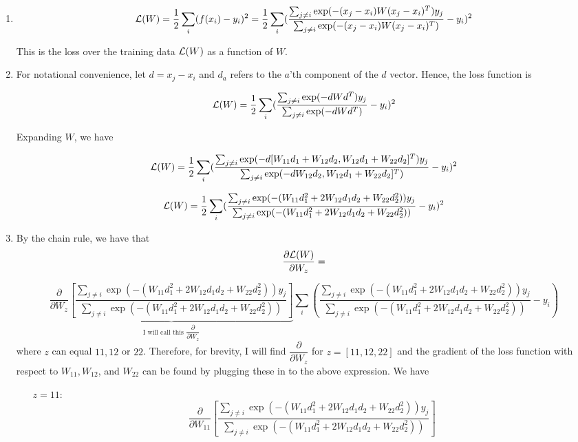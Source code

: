 \documentclass[submit]{harvardml}
\begin{document}
\begin{enumerate}
    \item $$\mathcal{L}(W) = \frac{1}{2}\sum_{i}(f(x_i)-y_i)^2 = \frac{1}{2}\sum_{i}(\frac{\sum_{j\neq i} \exp(-(x_j-x_i) W (x_j-x_i)^T )y_j}{\sum_{j\neq i} \exp(-(x_j-x_i) W (x_j-x_i)^T )} -y_i)^2$$
    
    This is the loss over the training data $\mathcal{L}(W)$ as a function of $W$.

    \item For notational convenience, let $d = x_j - x_i$ and $d_a$ refers to the $a$'th component of the $d$ vector. Hence, the loss function is
    
    $$\mathcal{L}(W) = \frac{1}{2}\sum_{i}(\frac{\sum_{j\neq i} \exp(-d W d^T )y_j}{\sum_{j\neq i} \exp(-d W d^T )} -y_i)^2$$
    
    Expanding $W$, we have
    
    $$\mathcal{L}(W) = \frac{1}{2}\sum_{i}(\frac{\sum_{j\neq i} \exp(-d [W_{11}d_1 + W_{12}d_2, W_{12}d_1 + W_{22}d_2]^T )y_j}{\sum_{j\neq i} \exp(-d W_{12}d_2, W_{12}d_1 + W_{22}d_2]^T )} -y_i)^2$$
    
    $$\mathcal{L}(W) = \frac{1}{2}\sum_{i}(\frac{\sum_{j\neq i} \exp(- (W_{11}d_1^2 + 2W_{12}d_1d_2 + W_{22}d_2^2) )y_j}{\sum_{j\neq i} \exp(-(W_{11}d_1^2 + 2W_{12}d_1d_2 + W_{22}d_2^2) )} -y_i)^2$$
    
    \item By the chain rule, we have that
    $$\frac{\partial \mathcal{L}(W)}{\partial W_{z}} = $$
    
    $$\underbrace{\frac{\partial }{\partial W_{z}} [\frac{\sum_{j\neq i} \exp(- (W_{11}d_1^2 + 2W_{12}d_1d_2 + W_{22}d_2^2) )y_j} {\sum_{j\neq i} \exp(-(W_{11}d_1^2 + 2W_{12}d_1d_2 + W_{22}d_2^2) )}]}_{\text{I will call this }\dfrac{\partial} {\partial W_{z}}}\sum_{i}(\frac{\sum_{j\neq i} \exp(- (W_{11}d_1^2 + 2W_{12}d_1d_2 + W_{22}d_2^2) )y_j}{\sum_{j\neq i} \exp(-(W_{11}d_1^2 + 2W_{12}d_1d_2 + W_{22}d_2^2) )} -y_i)
    $$
    where $z$ can equal $11, 12$ or $22$. Therefore, for brevity, I will find $\dfrac{\partial}{\partial W_{z}}$ for $z = [11, 12, 22]$ and  the gradient of the loss function with respect to $W_{11}, W_{12}$, and $W_{22}$ can be found by plugging these in to the above expression. We have
    \begin{enumerate}
        \item[$z = 11$:] 
        $$\frac{\partial }{\partial W_{11}} [\frac{\sum_{j\neq i} \exp(- (W_{11}d_1^2 + 2W_{12}d_1d_2 + W_{22}d_2^2) )y_j} {\sum_{j\neq i} \exp(-(W_{11}d_1^2 + 2W_{12}d_1d_2 + W_{22}d_2^2) )}]$$
        

\end{enumerate}
\end{enumerate}
\end{document}
